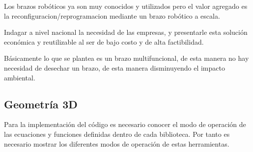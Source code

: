 \documentclass[main.tex]{subfiles}
\begin{document}
Los brazos robóticos ya son muy conocidos y utilizados pero el
valor agregado es la reconfiguracion/reprogramacion mediante un
brazo robótico a escala.

Indagar a nivel nacional la necesidad de las empresas, y presentarle
esta solución económica y reutilizable al ser de bajo costo y de alta
factibilidad.

Básicamente lo que se plantea es un brazo multifuncional, de esta manera
no hay necesidad de desechar un brazo, de esta manera disminuyendo el
impacto ambiental.


\subsection{Geometría 3D}
Para la implementación del código es necesario conocer el modo de operación de las ecuaciones y funciones definidas dentro de cada biblioteca. Por tanto es necesario mostrar los diferentes modos de operación de estas herramientas.
\end{document}
